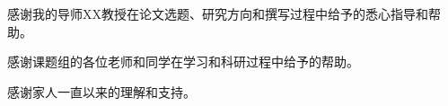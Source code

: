 \begin{acknowledge}


感谢我的导师XX教授在论文选题、研究方向和撰写过程中给予的悉心指导和帮助。

感谢课题组的各位老师和同学在学习和科研过程中给予的帮助。

感谢家人一直以来的理解和支持。

\end{acknowledge}
